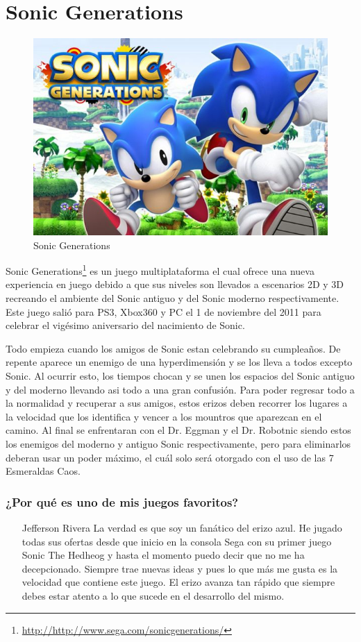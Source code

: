 \section{Sonic Generations}

\begin{figure}[htbp]
\begin{center}
\includegraphics[width=.60\textwidth]{./imagenes/sonic-generations.jpg}
\caption{Sonic Generations}
\label{Sonic Generations}
\end{center}
\end{figure}
Sonic Generations\footnote{\url{http://http://www.sega.com/sonicgenerations/}} es un juego multiplataforma el cual ofrece una nueva experiencia en juego debido a que sus niveles son llevados a escenarios 2D y 3D recreando el ambiente del Sonic antiguo y del Sonic moderno respectivamente. Este juego salió para PS3, Xbox360 y PC el 1 de noviembre del 2011 para celebrar el vigésimo aniversario del nacimiento de Sonic.

Todo empieza cuando los amigos de Sonic estan celebrando su cumpleaños. De repente aparece un enemigo de una hyperdimensión y se los lleva a todos excepto Sonic. Al ocurrir esto, los tiempos chocan y se unen los espacios del Sonic antiguo y del moderno llevando asi todo a una gran confusión. Para poder regresar todo a la normalidad y recuperar a sus amigos, estos erizos deben recorrer los lugares a la velocidad que los identifica y vencer a los mountros que aparezcan en el camino. Al final se enfrentaran con el Dr. Eggman y el Dr. Robotnic siendo estos los enemigos del moderno y antiguo Sonic respectivamente, pero para eliminarlos deberan usar un poder máximo, el cuál solo será otorgado con el uso de las 7 Esmeraldas Caos.

\subsubsection{¿Por qué es uno de mis juegos favoritos?}
\begin{itemize}
\item[Jefferson Rivera] La verdad es que soy un fanático del erizo azul. He jugado todas sus ofertas desde que inicio en la consola Sega con su primer juego Sonic The Hedheog y hasta el momento puedo decir que no me ha decepcionado. Siempre trae nuevas ideas y pues lo que más me gusta es la velocidad que contiene este juego. El erizo avanza tan rápido que siempre debes estar atento a lo que sucede en el desarrollo del mismo. 
\end{itemize}

